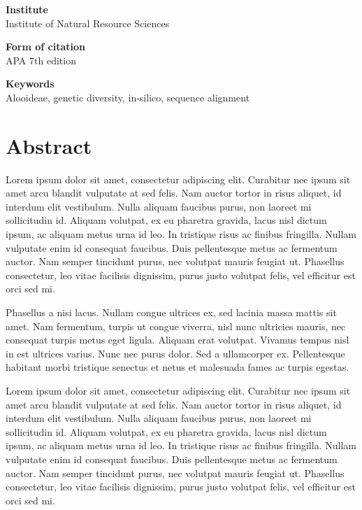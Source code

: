 \documentclass[
]{article}
\begin{document}
\vspace{0.5cm}

\textbf{Institute}\\
Institute of Natural Resource Sciences

\textbf{Form of citation}\\
APA 7th edition

\textbf{Keywords}\\
Alooideae, genetic diversity, in-silico, sequence alignment

\newpage

\hypertarget{abstract}{%
\section*{Abstract}\label{abstract}}

\thispagestyle{empty}

Lorem ipsum dolor sit amet, consectetur adipiscing elit. Curabitur nec
ipsum sit amet arcu blandit vulputate at sed felis. Nam auctor tortor in
risus aliquet, id interdum elit vestibulum. Nulla aliquam faucibus
purus, non laoreet mi sollicitudin id. Aliquam volutpat, ex eu pharetra
gravida, lacus nisl dictum ipsum, ac aliquam metus urna id leo. In
tristique risus ac finibus fringilla. Nullam vulputate enim id consequat
faucibus. Duis pellentesque metus ac fermentum auctor. Nam semper
tincidunt purus, nec volutpat mauris feugiat ut. Phasellus consectetur,
leo vitae facilisis dignissim, purus justo volutpat felis, vel efficitur
est orci sed mi.

Phasellus a nisi lacus. Nullam congue ultrices ex, sed lacinia massa
mattis sit amet. Nam fermentum, turpis ut congue viverra, nisl nunc
ultricies mauris, nec consequat turpis metus eget ligula. Aliquam erat
volutpat. Vivamus tempus nisl in est ultrices varius. Nunc nec purus
dolor. Sed a ullamcorper ex. Pellentesque habitant morbi tristique
senectus et netus et malesuada fames ac turpis egestas.

Lorem ipsum dolor sit amet, consectetur adipiscing elit. Curabitur nec
ipsum sit amet arcu blandit vulputate at sed felis. Nam auctor tortor in
risus aliquet, id interdum elit vestibulum. Nulla aliquam faucibus
purus, non laoreet mi sollicitudin id. Aliquam volutpat, ex eu pharetra
gravida, lacus nisl dictum ipsum, ac aliquam metus urna id leo. In
tristique risus ac finibus fringilla. Nullam vulputate enim id consequat
faucibus. Duis pellentesque metus ac fermentum auctor. Nam semper
tincidunt purus, nec volutpat mauris feugiat ut. Phasellus consectetur,
leo vitae facilisis dignissim, purus justo volutpat felis, vel efficitur
est orci sed mi.
\end{document}
